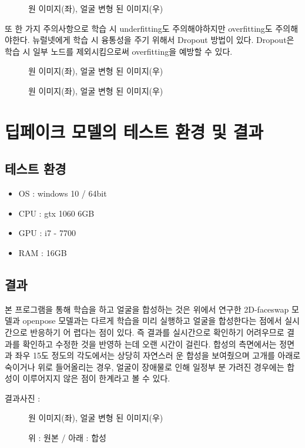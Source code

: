 \documentclass{oblivoir}
\newcommand{\spec}{
\begin{itemize}
    \item OS : windows 10 / 64bit
    \item CPU : gtx 1060 6GB
    \item GPU : i7 - 7700
    \item RAM : 16GB
\end{itemize}
}
\begin{document}
\begin{figure}[h!]
\centering
\caption{원 이미지(좌), 얼굴 변형 된 이미지(우)}
\end{figure}

또 한 가지 주의사항으로 학습 시 underfitting도 주의해야하지만 overfitting도 주의해야한다. 뉴럴넷에게 학습 시 융통성을 주기 위해서 Dropout 방법이 있다. Dropout은 학습 시 일부 노드를 제외시킴으로써 overfitting을 예방할 수 있다.

\begin{figure}[h!]
\centering
\caption{원 이미지(좌), 얼굴 변형 된 이미지(우)}
\end{figure}

\begin{figure}[h!]
\centering
\caption{원 이미지(좌), 얼굴 변형 된 이미지(우)}
\end{figure}

\section{ 딥페이크 모델의 테스트 환경 및 결과}

\subsection{테스트 환경 }
\spec
\subsection{결과}

본 프로그램을 통해 학습을 하고 얼굴을 합성하는 것은 위에서 연구한 2D-faceswap 모델과  openpose 모델과는 다르게 학습을 미리 실행하고 얼굴을 합성한다는 점에서 실시간으로 반응하기 어 렵다는 점이 있다. 즉 결과를 실시간으로 확인하기 어려우므로 결과를 확인하고 수정한 것을 반영하 는데 오랜 시간이 걸린다. 합성의 측면에서는 정면과 좌우 15도 정도의 각도에서는 상당히 자연스러 운 합성을 보여줬으며 고개를 아래로 숙이거나 위로 들어올리는 경우, 얼굴이 장애물로 인해 일정부 분 가려진 경우에는 합성이 이루어지지 않은 점이 한계라고 볼 수 있다.

결과사진 :

\begin{figure}[h!]
\centering
\caption{원 이미지(좌), 얼굴 변형 된 이미지(우)}
\end{figure}

\begin{figure}[h!]
\centering
\caption{위 : 원본 / 아래 : 합성}
\end{figure}
\end{document}
